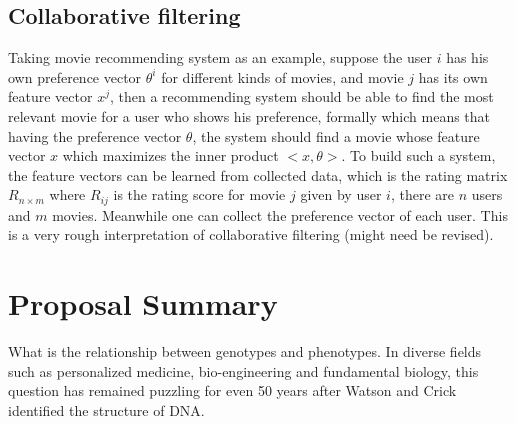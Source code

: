 \documentclass[paper=a4, fontsize=12pt]{scrartcl}	%
\numberwithin{equation}{section}					%
\numberwithin{figure}{section}					%
\numberwithin{table}{section}					%
\begin{document}
\subsection{Collaborative filtering}
Taking movie recommending system as an example, suppose the user $i$ has his own preference vector $\theta^i$ for different kinds of movies, and movie $j$ has its own feature vector $x^j$, then a recommending system should be able to find the most relevant movie for a user who shows his preference, formally which means that having the preference vector $\theta$, the system should find a movie whose feature vector $x$ which maximizes the inner product $<x, \theta>$. To build such a system, the feature vectors can be learned from collected data, which is the rating matrix $R_{n\times m}$ where $R_{ij}$ is the rating score for movie $j$ given by user $i$, there are $n$ users and $m$ movies. Meanwhile one can collect the preference vector of each user. This is a very rough interpretation of collaborative filtering (might need be revised).
\subsection{}


\section{Proposal Summary}
What is the relationship between genotypes and phenotypes. In diverse fields such as personalized medicine, bio-engineering and fundamental biology, this question has remained puzzling for even 50 years after Watson and Crick identified the structure of DNA. 
\end{document}
